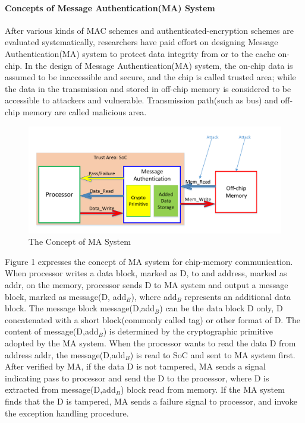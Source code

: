\documentclass{article}
\begin{document}
\paragraph{Concepts of Message Authentication(MA) System}
After various kinds of MAC schemes and authenticated-encryption schemes are evaluated systematically, researchers have paid effort on designing Message Authentication(MA) system to protect data integrity from or to the cache on-chip. 
In the design of Message Authentication(MA) system, the on-chip data is assumed to be inaccessible and secure, and the chip is called trusted area; while the data in the transmission and stored in off-chip memory is considered to be accessible to attackers and vulnerable. Transmission path(such as bus) and off-chip memory are called malicious area. 
\begin{figure}[htbp]
\centering
\includegraphics[scale=0.5]{./diagrams/MA_concept.pdf}
\caption{The Concept of MA System}
\label{ma_system}
\end{figure}
Figure 1 expresses the concept of MA system for chip-memory communication. 
When processor writes a data block, marked as D, to and address, marked as addr, on the memory, processor sends D to MA system and output a message block, marked as message(D, add$_B$), where add$_B$ represents an additional data block. The message block message(D,add$_B$) can be the data block D only, D concatenated with a short block(commonly called tag) or other format of D. The content of message(D,add$_B$) is determined by the cryptographic primitive adopted by the MA system.
When the processor wants to read the data D from address addr, the message(D,add$_B$) is read to SoC and sent to MA system first. After verified by MA, if the data D is not tampered, MA sends a signal indicating pass to processor and send the D to the processor, where D is extracted from message(D,add$_B$) block read from memory.
If the MA system finds that the D is tampered, MA sends a failure signal to processor, and invoke the exception handling procedure.
\end{document}
